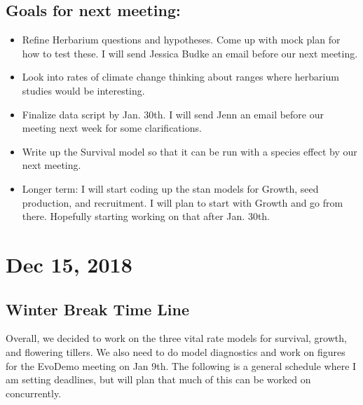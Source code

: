 \documentclass{article}
\begin{document}
\subsection*{Goals for next meeting:}
\begin{itemize}
\item{Refine Herbarium questions and hypotheses. Come up with mock plan for how to test these. I will send Jessica Budke an email before our next meeting.}
\item{Look into rates of climate change thinking about ranges where herbarium studies would be interesting.}
\item{Finalize data script by Jan. 30th. I will send Jenn an email before our meeting next week for some clarifications.}
\item{Write up the Survival model so that it can be run with a species effect by our next meeting.}
\item{Longer term: I will start coding up the stan models for Growth, seed production, and recruitment. I will plan to start with Growth and go from there. Hopefully starting working on that after Jan. 30th.}
\end{itemize}



\section*{Dec 15, 2018}
\subsection*{Winter Break Time Line}
Overall, we decided to work on the three vital rate models for survival, growth, and flowering tillers. We also need to do model diagnostics and work on figures for the EvoDemo meeting on Jan 9th. The following is a general schedule where I am setting deadlines, but will plan that much of this can be worked on concurrently.
\end{document}
